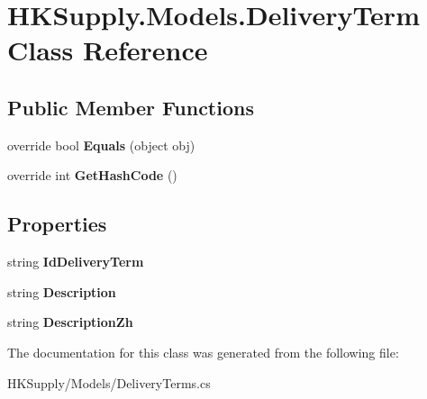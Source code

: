 \hypertarget{class_h_k_supply_1_1_models_1_1_delivery_term}{}\section{H\+K\+Supply.\+Models.\+Delivery\+Term Class Reference}
\label{class_h_k_supply_1_1_models_1_1_delivery_term}
\subsection*{Public Member Functions}
\begin{DoxyCompactItemize}
\item 
\mbox{\label{class_h_k_supply_1_1_models_1_1_delivery_term_a00199d36c691629580c9a7afc666d7b6}} 
override bool {\bfseries Equals} (object obj)
\item 
\mbox{\label{class_h_k_supply_1_1_models_1_1_delivery_term_aa14a7d778cf45c911a06a24cdba54c56}} 
override int {\bfseries Get\+Hash\+Code} ()
\end{DoxyCompactItemize}
\subsection*{Properties}
\begin{DoxyCompactItemize}
\item 
\mbox{\label{class_h_k_supply_1_1_models_1_1_delivery_term_af1531d28d12fff8df4df35187e7b9823}} 
string {\bfseries Id\+Delivery\+Term}
\item 
\mbox{\label{class_h_k_supply_1_1_models_1_1_delivery_term_a1b433740684d0b135d33bd9b1b86fe82}} 
string {\bfseries Description}
\item 
\mbox{\label{class_h_k_supply_1_1_models_1_1_delivery_term_a1fd62419a8b0e230c2b710179fcaab86}} 
string {\bfseries Description\+Zh}
\end{DoxyCompactItemize}


The documentation for this class was generated from the following file\+:\begin{DoxyCompactItemize}
\item 
H\+K\+Supply/\+Models/Delivery\+Terms.\+cs\end{DoxyCompactItemize}
